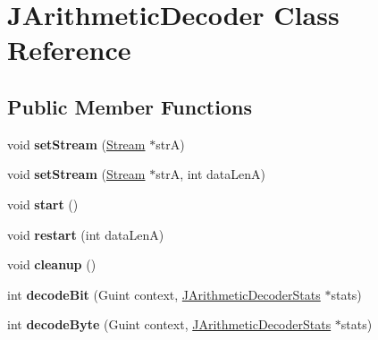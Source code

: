 \hypertarget{class_j_arithmetic_decoder}{}\section{J\+Arithmetic\+Decoder Class Reference}
\label{class_j_arithmetic_decoder}
\subsection*{Public Member Functions}
\begin{DoxyCompactItemize}
\item 
\mbox{\label{class_j_arithmetic_decoder_a53bca01613a92b25413f59608ae55391}} 
void {\bfseries set\+Stream} (\hyperlink{class_stream}{Stream} $\ast$strA)
\item 
\mbox{\label{class_j_arithmetic_decoder_a1159f502542ae751c2d08a807efbd3b9}} 
void {\bfseries set\+Stream} (\hyperlink{class_stream}{Stream} $\ast$strA, int data\+LenA)
\item 
\mbox{\label{class_j_arithmetic_decoder_ae7a09763c204c5d444ecdf382dde97c6}} 
void {\bfseries start} ()
\item 
\mbox{\label{class_j_arithmetic_decoder_a3a7f4d27053aa6c4dc47f48e52374ce2}} 
void {\bfseries restart} (int data\+LenA)
\item 
\mbox{\label{class_j_arithmetic_decoder_a2e7b7e2b43e11098e16a1fffaab7b505}} 
void {\bfseries cleanup} ()
\item 
\mbox{\label{class_j_arithmetic_decoder_aa4fd027f05dee3a0568f217dc7ea9fed}} 
int {\bfseries decode\+Bit} (Guint context, \hyperlink{class_j_arithmetic_decoder_stats}{J\+Arithmetic\+Decoder\+Stats} $\ast$stats)
\item 
\mbox{\label{class_j_arithmetic_decoder_a2ead37ad674169c8d3f9cf91d5b57b3a}} 
int {\bfseries decode\+Byte} (Guint context, \hyperlink{class_j_arithmetic_decoder_stats}{J\+Arithmetic\+Decoder\+Stats} $\ast$stats)
\item 
\mbox{\label{class_j_arithmetic_decoder_aae6cc3b6241673139187e99cbd071519}} 

\end{DoxyCompactItemize}
